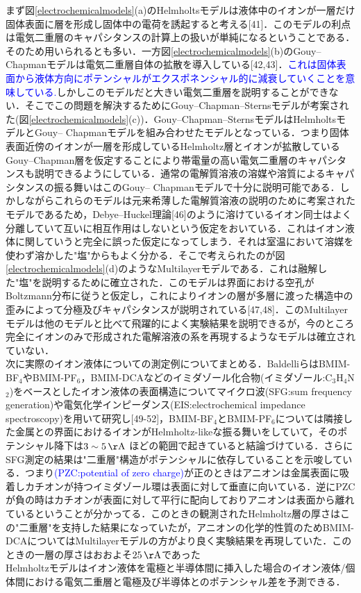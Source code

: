 まず図\ref{electrochemicalmodels}(a)のHelmholtsモデルは液体中のイオンが一層だけ固体表面に層を形成し固体中の電荷を誘起すると考える[41]．このモデルの利点は電気二重層のキャパシタンスの計算上の扱いが単純になるということである．そのため用いられるとも多い．一方図\ref{electrochemicalmodels}(b)のGouy– Chapmanモデルは電気二重層自体の拡散を導入している[42,43]．\textcolor{blue}{これは固体表面から液体方向にポテンシャルがエクスポネンシャル的に減衰していくことを意味している.}しかしこのモデルだと大きい電気二重層を説明することができない．そこでこの問題を解決するためにGouy–Chapman–Sternsモデルが考案された(図\ref{electrochemicalmodels}(c))．Gouy–Chapman–SternsモデルはHelmholtsモデルとGouy– Chapmanモデルを組み合わせたモデルとなっている．つまり固体表面近傍のイオンが一層を形成しているHelmholtz層とイオンが拡散しているGouy–Chapman層を仮定することにより帯電量の高い電気二重層のキャパシタンスも説明できるようにしている．通常の電解質溶液の溶媒や溶質によるキャパシタンスの振る舞いはこのGouy– Chapmanモデルで十分に説明可能である．しかしながらこれらのモデルは元来希薄した電解質溶液の説明のために考案されたモデルであるため，Debye–Huckel理論[46]のように溶けているイオン同士はよく分離していて互いに相互作用はしないという仮定をおいている．これはイオン液体に関していうと完全に誤った仮定になってしまう．それは室温において溶媒を使わず溶かした"塩"からもよく分かる．そこで考えられたのが図\ref{electrochemicalmodels}(d)のようなMultilayerモデルである．これは融解した"塩"を説明するために確立された．このモデルは界面における空孔がBoltzmann分布に従うと仮定し，これによりイオンの層が多層に渡った構造中の歪みによって分極及びキャパシタンスが説明されている[47,48]．このMultilayerモデルは他のモデルと比べて飛躍的によく実験結果を説明できるが，今のところ完全にイオンのみで形成された電解溶液の系を再現するようなモデルは確立されていない．\\

次に実際のイオン液体についての測定例についてまとめる．BaldelliらはBMIM-BF$_{4}$やBMIM-PF$_{6}$，BMIM-DCAなどのイミダゾール化合物(イミダゾール:C$_{3}$H$_{4}$N$_{2}$)をベースとしたイオン液体の表面構造についてマイクロ波(SFG:sum frequency generation)や電気化学インピーダンス(EIS:electrochemical impedance spectroscopy)を用いて研究し[49-52]，BMIM-BF$_{4}$とBMIM-PF$_{6}$については隣接した金属との界面におけるイオンがHelmholtz-likeな振る舞いをしていて，そのポテンシャル降下は$3\sim 5\,\mathrm{\AA}$ ほどの範囲で起きていると結論づけている．さらにSFG測定の結果は"二重層"構造がポテンシャルに依存していることを示唆している．つまり\textcolor{blue}{(PZC:potential of zero charge)}が正のときはアニオンは金属表面に吸着しカチオンが持つイミダゾール環は表面に対して垂直に向いている．逆にPZCが負の時はカチオンが表面に対して平行に配向しておりアニオンは表面から離れているということが分かってる．このときの観測されたHelmholtz層の厚さはこの"二重層"を支持した結果になっていたが，アニオンの化学的性質のためBMIM-DCAについてはMultilayerモデルの方がより良く実験結果を再現していた．このときの一層の厚さはおおよそ$25\,\mathrm{\AA}$であった\\
Helmholtzモデルはイオン液体を電極と半導体間に挿入した場合のイオン液体/個体間における電気二重層と電極及び半導体とのポテンシャル差を予測できる．

